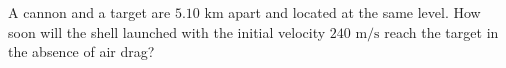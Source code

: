 
\item A cannon and a target are \(5.10 \text{ km}\) apart and located at the same level. How soon will the shell launched with the initial velocity \(240 \text{ m/s}\) reach the target in the absence of air drag?
